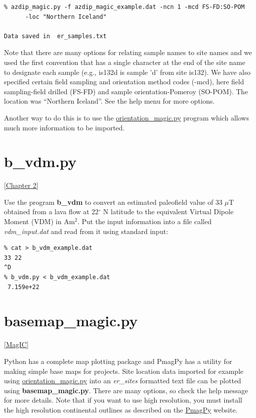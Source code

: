 \documentclass[11pt]{book}
\begin{document}
{{{{{\begin{verbatim}
% azdip_magic.py -f azdip_magic_example.dat -ncn 1 -mcd FS-FD:SO-POM
      -loc "Northern Iceland"

Data saved in  er_samples.txt
\end{verbatim}

Note that there are many options for relating sample names to site names and we used the first convention that has a single character at the end of the site name to designate each sample (e.g., is132d is sample 'd' from site is132).   We have also specified certain field sampling and orientation method codes (-mcd), here field sampling-field drilled (FS-FD) and sample orientation-Pomeroy (SO-POM).  The location was ``Northern Iceland''.   See the help menu for more options.   

Another way to do this is to use the \href{#orientation_magic.py}{orientation\_magic.py} program which allows much more information to be imported.  

\section {\bf b\_vdm.py} 
\href{http://Webbookcopy.html#The_geomagnetic_field}{[Chapter 2]}
\label{ex:b_vdm}

Use the program {\bf b\_vdm} to convert an estimated paleofield value of 33 $\mu$T obtained from a lava flow at 22$^{\circ}$ N latitude to the equivalent Virtual Dipole Moment (VDM) in Am$^2$.   Put the input information into a file called {\it vdm\_input.dat}  and read from it using standard input:

\begin{verbatim}
% cat > b_vdm_example.dat
33 22
^D
% b_vdm.py < b_vdm_example.dat
 7.159e+22 
\end{verbatim}

\section{basemap\_magic.py}
\label{ex:basemap_magic}
\href{#MagIC}{[MagIC]}

Python has a complete map plotting package and PmagPy has a utility for making simple base maps for projects.  Site location data imported for example using \href{#orientation_magic.py}{orientation\_magic.py} into an {\it er\_sites} formatted text file can be plotted using {\bf basemap\_magic.py}.  There are many options, so check the help message for more details.   Note that if you want to use high resolution, you must install the high resolution continental outlines as described on the  \href{http://magician.ucsd.edu/software/pmagpy/}{PmagPy} website.

}}}}}
\end{document}
